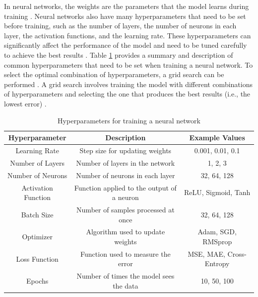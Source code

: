 In neural networks, the weights are the parameters that the model learns during training \cite{gurney2018introduction}. Neural networks also have many hyperparameters that need to be set before training, such as the number of layers, the number of neurons in each layer, the activation functions, and the learning rate. These hyperparameters can significantly affect the performance of the model and need to be tuned carefully to achieve the best results \cite{gurney2018introduction}. Table \ref{tab:hyperparameters} provides a summary and description of common hyperparameters that need to be set when training a neural network. To select the optimal combination of hyperparameters, a grid search can be performed \cite{gurney2018introduction}. A grid search involves training the model with different combinations of hyperparameters and selecting the one that produces the best results (i.e., the lowest error) \cite{gurney2018introduction}.

\begin{table}
    \centering
    \begin{tabular}{|c|c|c|}
    \hline
    Hyperparameter & Description & Example Values \\
    \hline
    Learning Rate & Step size for updating weights & 0.001, 0.01, 0.1 \\
    Number of Layers & Number of layers in the network & 1, 2, 3 \\
    Number of Neurons & Number of neurons in each layer & 32, 64, 128 \\
    Activation Function & Function applied to the output of a neuron & ReLU, Sigmoid, Tanh \\
    Batch Size & Number of samples processed at once & 32, 64, 128 \\
    Optimizer & Algorithm used to update weights & Adam, SGD, RMSprop \\
    Loss Function & Function used to measure the error & MSE, MAE, Cross-Entropy \\
    Epochs & Number of times the model sees the data & 10, 50, 100 \\
    \hline
    \end{tabular}
    \caption{Hyperparameters for training a neural network}
    \label{tab:hyperparameters}
\end{table}

